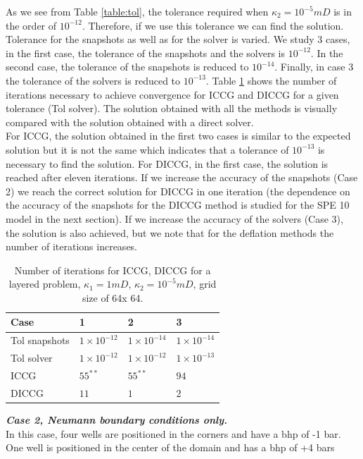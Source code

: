 \documentclass{ecmorXV}
\begin{document}
As we see from Table \ref{table:tol}, the tolerance required when $\kappa_2=10^{-5}mD$ is in the 
order of $10^{-12}$. Therefore, if we use this tolerance we can find the solution. 
Tolerance for the snapshots as well as for the solver is varied. We study 3 cases, in the first
case, the tolerance of the snapshots and the solvers is $10^{-12}$. In the second case, the 
tolerance of the snapshots is reduced to $10^{-14}$. Finally, in case 3 the tolerance of the 
solvers is reduced to $10^{-13}$. Table \ref{table:tol1} 
shows the number of iterations necessary to achieve convergence for ICCG and DICCG
for a given tolerance (Tol solver). The solution obtained with all the methods is visually 
compared with the solution obtained 
with a direct solver. \\
For ICCG, the solution obtained in the first two cases is similar to the expected solution but it 
is not the same which indicates that a tolerance of $10^{-13}$ is necessary to find the solution. 
For DICCG, in the first case, the solution is reached after eleven iterations. 
If we increase the accuracy of the 
snapshots (Case 2) we reach the correct solution for DICCG in one iteration (the dependence on the 
accuracy of the snapshots for the DICCG method is studied for the SPE 10 model in the next section). 
If we increase the accuracy of the solvers (Case 3), the solution is also achieved, but we note that 
for the deflation methods the number of iterations increases. 
\begin{table}[!ht]
\centering
\begin{tabular}{ |p{3cm}|p{1.5cm}|p{1.5cm}|p{1.5cm}| } 
\hline
Case &1&2&3\\ 
\hline
Tol snapshots &$1\times 10^{-12}$&$1\times10^{-14}$&$1\times10^{-14}$\\
   \hline
Tol solver &$1\times10^{-12}$&$1\times10^{-12}$&$1\times10^{-13}$\\

\hline
ICCG &$55^{**}$&$55^{**}$&$94$\\
   \hline
DICCG&$11$&$1$&$2$\\
\hline
\end{tabular}
\caption{Number of iterations for ICCG, DICCG for a layered problem, $\kappa_1=1mD$, $\kappa_2=10^{-5}mD$, grid size of 64x 64.}
\label{table:tol1}
\end{table}
\newpage
\textbf{\emph{Case 2, Neumann boundary conditions only.}}\\
In this case, four wells are positioned in the corners and have a bhp of -1 bar. One well
is positioned in the center of the domain and has a bhp of +4 bars
\end{document}
